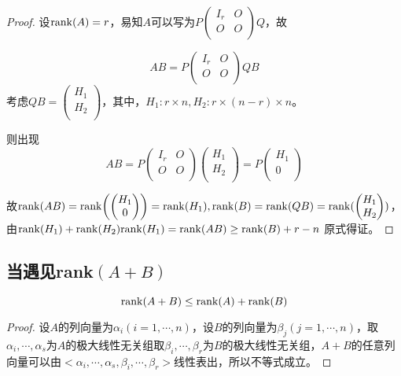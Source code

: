 \begin{proof}
	设${\rm rank}(A)=r$，易知$A$可以写为$P\left (
		\begin{matrix}
				I_r & O \\
				O   & O \\
			\end{matrix}
		\right  )Q$，故

	$$AB=P\left (
		\begin{matrix}
				I_r & O \\
				O   & O \\
			\end{matrix}
		\right  )QB$$
	考虑$QB=\left (
		\begin{matrix}
				H_1 \\
				H_2 \\
			\end{matrix}
		\right  )$，其中，$H_1:r\times n,H_2:r\times (n-r)\times n$。

	则出现
	$$AB=P\left (
		\begin{matrix}
				I_r & O \\
				O   & O \\
			\end{matrix}
		\right  )\left (
		\begin{matrix}
				H_1 \\
				H_2 \\
			\end{matrix}
		\right  )=P\left (
		\begin{matrix}
				H_1 \\
				0   \\
			\end{matrix}
		\right  )$$

	故${\rm rank}(AB)={\rm rank}\qty(\left (
		\begin{matrix}
				H_1 \\
				0   \\
			\end{matrix}
		\right  ))={\rm rank}(H_1),{\rm rank}(B)={\rm rank}(QB)={\rm rank}(\left (
		\begin{matrix}
				H_1 \\
				H_2 \\
			\end{matrix}
		\right  ))$，由${\rm rank}(H_1)+{\rm rank}(H_2){\rm rank}(H_1)={\rm rank}(AB)\geq {\rm rank}(B)+r-n$
	原式得证。
\end{proof}
\subsection{当遇见rank$(A+B)$}
$${\rm rank}(A+B)\leq {\rm rank}(A)+{\rm rank}(B)$$
\begin{proof}
	设$A$的列向量为$\alpha_i(i=1,\cdots,n)$，设$B$的列向量为$\beta_j(j=1,\cdots,n)$，取$\alpha_i,\cdots,\alpha_s$为$A$的极大线性无关组取$\beta_i,\cdots,\beta_r$为$B$的极大线性无关组，$A+B$的任意列向量可以由$<\alpha_i,\cdots,\alpha_s,\beta_i,\cdots,\beta_r>$线性表出，所以不等式成立。
\end{proof}
